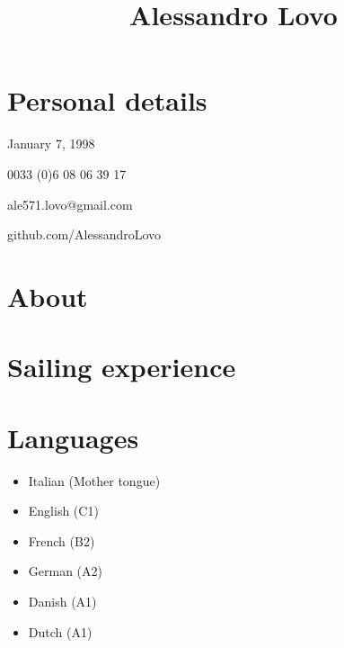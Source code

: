 \documentclass[11pt, a4 paper]{article}
\begin{document}
\title{Alessandro Lovo}
\date{}
\author{}
\maketitle


\section*{Personal details}
  \begin{multicols}{2}
    \begin{description}[style=multiline,leftmargin=2cm,align=right]
      \item[birth] January 7, 1998
      \item[phone] 0033 (0)6 08 06 39 17
      \item[e-mail]
        ale571.lovo@gmail.com

      \item[GitHub] github.com/AlessandroLovo
    \end{description}
  \end{multicols}



\section*{About}

\section*{Sailing experience}


\section*{Languages}
  \begin{itemize}
      \item Italian (Mother tongue)
      \item English (C1)
      \item French (B2)
      \item German (A2)
      \item Danish (A1)
      \item Dutch (A1)
  \end{itemize}
\end{document}
